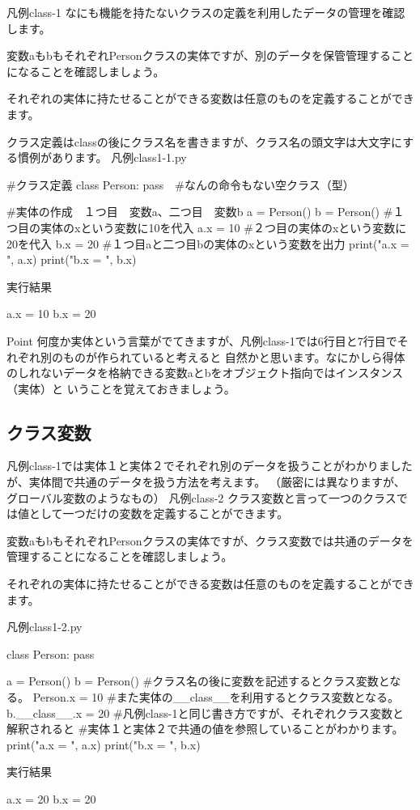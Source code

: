 {\gt 凡例class-1}
なにも機能を持たないクラスの定義を利用したデータの管理を確認します。

変数aもbもそれぞれPersonクラスの実体ですが、別のデータを保管管理することになることを確認しましょう。

それぞれの実体に持たせることができる変数は任意のものを定義することができます。


クラス定義はclassの後にクラス名を書きますが、クラス名の頭文字は大文字にする慣例があります。
{\gt 凡例class1-1.py}
\begin{listing}{1}
#クラス定義
class Person:
    pass　#なんの命令もない空クラス（型）
    
#実体の作成　１つ目　変数a、二つ目　変数b
a = Person()
b = Person()
#１つ目の実体のxという変数に10を代入
a.x = 10
#２つ目の実体のxという変数に20を代入
b.x = 20
#１つ目aと二つ目bの実体のxという変数を出力 
print("a.x = ", a.x)
print("b.x = ", b.x)
\end{listing}
実行結果
\begin{listing}{1}
a.x =  10
b.x =  20
\end{listing}


{\gt Point}
何度か実体という言葉がでてきますが、凡例class-1では6行目と7行目でそれぞれ別のものが作られていると考えると
自然かと思います。なにかしら得体のしれないデータを格納できる変数aとbをオブジェクト指向ではインスタンス（実体）と
いうことを覚えておきましょう。

\newpage
\subsection{クラス変数}
凡例class-1では実体１と実体２でそれぞれ別のデータを扱うことがわかりましたが、実体間で共通のデータを扱う方法を考えます。
（厳密には異なりますが、グローバル変数のようなもの）
{\gt 凡例class-2}
クラス変数と言って一つのクラスでは値として一つだけの変数を定義することができます。

変数aもbもそれぞれPersonクラスの実体ですが、クラス変数では共通のデータを管理することになることを確認しましょう。

それぞれの実体に持たせることができる変数は任意のものを定義することができます。

{\gt 凡例class1-2.py}
\begin{listing}{1}
class Person:
    pass

a = Person()
b = Person()
#クラス名の後に変数を記述するとクラス変数となる。
Person.x = 10
#また実体の__class__を利用するとクラス変数となる。
b.__class__.x = 20
#凡例class-1と同じ書き方ですが、それぞれクラス変数と解釈されると
#実体１と実体２で共通の値を参照していることがわかります。
print("a.x = ", a.x)
print("b.x = ", b.x)
\end{listing}
実行結果
\begin{listing}{1}
a.x =  20
b.x =  20
\end{listing}






